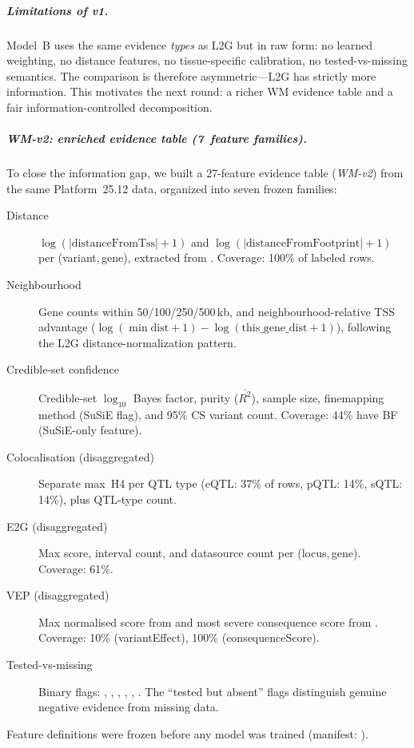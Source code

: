 \documentclass[11pt,openany]{report}
\begin{document}
\subparagraph{Limitations of v1.}
Model~B uses the same evidence \emph{types} as L2G but in raw form:
no learned weighting, no distance features, no tissue-specific
calibration, no tested-vs-missing semantics.  The comparison is
therefore asymmetric---L2G has strictly more information.
This motivates the next round: a richer WM evidence table and
a fair information-controlled decomposition.

\subparagraph{WM-v2: enriched evidence table (7~feature families).}
To close the information gap, we built a 27-feature evidence table
(\emph{WM-v2}) from the same Platform~25.12 data, organized into
seven frozen families:
\begin{description}
\item[Distance] $\log(|\text{distanceFromTss}|+1)$ and
  $\log(|\text{distanceFromFootprint}|+1)$ per (variant,\,gene),
  extracted from .
  Coverage: 100\% of labeled rows.
\item[Neighbourhood] Gene counts within 50/100/250/500\,kb,
  and neighbourhood-relative TSS advantage
  ($\log(\min\text{dist}+1) - \log(\text{this\_gene\_dist}+1)$),
  following the L2G distance-normalization pattern.
\item[Credible-set confidence] Credible-set $\log_{10}$ Bayes factor,
  purity ($\overline{R^2}$), sample size, finemapping method (SuSiE flag),
  and 95\% CS variant count.  Coverage: 44\% have BF
  (SuSiE-only feature).
\item[Colocalisation (disaggregated)] Separate max~H4 per QTL type
  (eQTL: 37\% of rows, pQTL: 14\%, sQTL: 14\%), plus QTL-type count.
\item[E2G (disaggregated)] Max score, interval count, and datasource
  count per (locus,\,gene).  Coverage: 61\%.
\item[VEP (disaggregated)] Max normalised score from
   and most severe consequence score from
  .  Coverage: 10\% (variantEffect),
  100\% (consequenceScore).
\item[Tested-vs-missing] Binary flags: ,
  , , ,
  , .
  The ``tested but absent'' flags distinguish genuine negative
  evidence from missing data.
\end{description}
\noindent
Feature definitions were frozen before any model was trained
(manifest: ).
\end{document}
